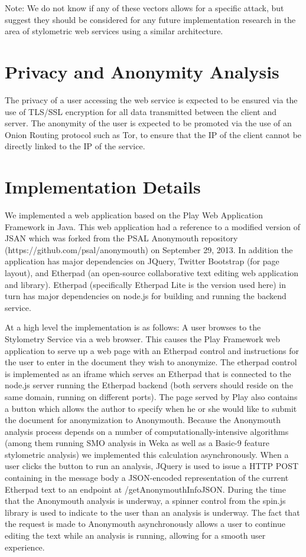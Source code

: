 \documentclass[letterpaper]{article}
\begin{document}
Note: We do not know if any of these vectors allows for a specific
attack, but suggest they should be considered for any future
implementation research in the area of stylometric web services using
a similar architecture.

\section{Privacy and Anonymity Analysis}

The privacy of a user accessing the web service is expected to be
ensured via the use of TLS/SSL encryption for all data transmitted
between the client and server. The anonymity of the user is expected
to be promoted via the use of an Onion Routing protocol such as Tor,
to ensure that the IP of the client cannot be directly linked to the
IP of the service.

\section{Implementation Details}

We implemented a web application based on the Play Web Application
Framework in Java. This web application had a reference to a modified
version of JSAN which was forked from the PSAL Anonymouth repository
(https://github.com/psal/anonymouth) on September 29, 2013. In
addition the application has major dependencies on JQuery, Twitter
Bootstrap (for page layout), and Etherpad  (an open-source collaborative text editing
web application and library). Etherpad (specifically Etherpad Lite is
the version used here) in turn has major dependencies on
node.js for building and running the backend service.

At a high level the implementation is as follows: A user browses to
the Stylometry Service via a web browser. This causes the Play
Framework web application to serve up a web page with an Etherpad control
and instructions for the user to enter in the document they wish to
anonymize. The etherpad control is implemented as an iframe which
serves an Etherpad that is connected to the node.js server running the
Etherpad backend (both servers should reside on the same domain,
running on different ports). The page served by Play also contains a
button which allows the author to specify when he or she would like to
submit the document for anonymization to Anonymouth. Because the
Anonymouth analysis process depends on a number of
computationally-intensive algorithms (among them running SMO analysis
in Weka as well as a Basic-9 feature stylometric analysis) we
implemented this calculation asynchronously. When a user clicks the
button to run an analysis, JQuery is used to issue a HTTP POST
containing in the message body a JSON-encoded
representation of the current Etherpad text to an endpoint at
/getAnonymouthInfoJSON. During the time that the Anonymouth analysis
is underway, a spinner control from the spin.js library is used to
indicate to the user than an analysis is underway. The fact that the
request is made to Anonymouth asynchronously allows a user to continue
editing the text while an analysis is running, allowing for a smooth
user experience.
\end{document}
